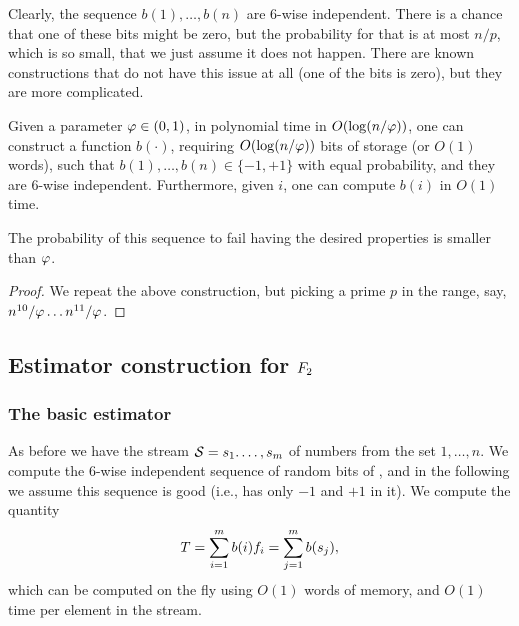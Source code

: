 Clearly, the sequence $b(1), \ldots, b(n)$ are $6$-wise
independent. There is a chance that one of these bits might be zero,
but the probability for that is at most $n/p$, which is so small, that
we just assume it does not happen. There are known constructions that
do not have this issue at all (one of the bits is zero), but they are
more complicated.

\begin{lemma}
    Given a parameter $\varphi \in (0,1)$, in polynomial time in
    $O(\log (n/\varphi))$, one can construct a function $b(\cdot)$,
    requiring $O( \log (n/\varphi))$ bits of storage (or $O(1)$
    words), such that $b(1), \ldots, b(n) \in \{-1,+1\}$ with equal
    probability, and they are $6$-wise independent. Furthermore, given
    $i$, one can compute $b(i)$ in $O(1)$ time.

    The probability of this sequence to fail having the desired
    properties is smaller than $\varphi$.
\end{lemma}
\begin{proof}
    We repeat the above construction, but picking a prime $p$ in the
    range, say, $n^{10}/ \varphi \ldots n^{11} /\varphi$.
\end{proof}




\subsection{Estimator construction for $F_2$}
\subsubsection{The basic estimator}

As before we have the stream $\mathcal{S} = {s}_1.\ldots, {s}_m$ of
numbers from the set $1, \ldots, n$. We compute the $6$-wise
independent sequence of random bits of
, and in the following we assume
this sequence is good (i.e., has only $-1$ and $+1$ in it). We compute
the quantity
\begin{equation*}
    T = \sum_{i=1}^m b(i) \frq_i%
    =%
    \sum_{j=1}^m b( \strm_j),
\end{equation*}
which can be computed on the fly using $O(1)$ words of memory, and
$O(1)$ time per element in the stream.

